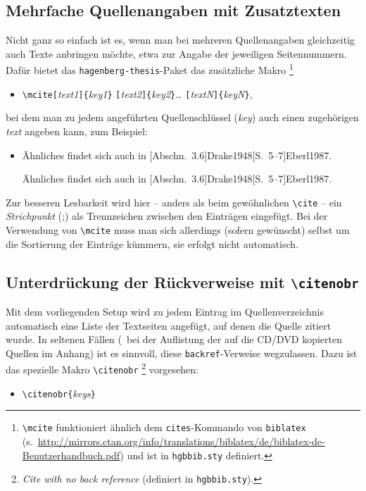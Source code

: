 \subsection{Mehrfache Quellenangaben mit Zusatztexten}

Nicht ganz so einfach ist es, wenn man bei mehreren Quellenangaben gleichzeitig
auch Texte anbringen möchte, etwa zur Angabe der jeweiligen Seitennummern.
Dafür bietet das \texttt{hagenberg-thesis}-Paket das zusätzliche Makro%
\footnote{\texttt{\textbackslash mcite} funktioniert ähnlich dem \texttt{{\bs}cites}-Kommando
von \texttt{biblatex} 
(s.\ \url{http://mirrors.ctan.org/info/translations/biblatex/de/biblatex-de-Benutzerhandbuch.pdf})
und ist in \texttt{hgbbib.sty} definiert.}
%
\begin{itemize}
\item[] 
\verb!\mcite[!\textit{text1}\verb!]{!\textit{key1}\verb!}!%
      \verb![!\textit{text2}\verb!]{!\textit{key2}\verb!}!\ldots%
			\verb![!\textit{textN}\verb!]{!\textit{keyN}\verb!}!,
\end{itemize}
bei dem man zu jedem angeführten Quellenschlüssel (\textit{key}) auch einen zugehörigen \textit{text}
angeben kann, zum Beispiel:
%
\begin{itemize}
\item
Ähnliches findet sich auch in 
[Abschn.~3.6]{Drake1948}[S.~5--7]{Eberl1987}.
%
\begin{LaTeXCode}[numbers=none]
Ähnliches findet sich auch in
[Abschn.~3.6]{Drake1948}[S.~5--7]{Eberl1987}.
\end{LaTeXCode}
\end{itemize}
%
Zur besseren Lesbarkeit wird hier -- anders als beim gewöhnlichen \texttt{\textbackslash cite} --
ein \emph{Strichpunkt} (;) als Trennzeichen zwischen den Einträgen eingefügt.
Bei der Verwendung von \texttt{\textbackslash mcite} muss man sich allerdings (sofern gewünscht) selbst 
um die Sortierung der Einträge kümmern, sie erfolgt nicht automatisch.



\subsection{Unterdrückung der Rückverweise mit \texttt{\textbackslash citenobr}}

Mit dem vorliegenden Setup wird zu jedem Eintrag im Quellenverzeichnis automatisch 
eine Liste der Textseiten angefügt, auf denen die Quelle zitiert wurde.
In seltenen Fällen (\zB\ bei der Auflistung der auf die CD/DVD kopierten Quellen im Anhang)
ist es sinnvoll, diese \texttt{backref}-Verweise wegzulassen. Dazu ist das spezielle Makro
\texttt{\textbackslash citenobr}%
\footnote{\emph{Cite with no back reference} (definiert in \texttt{hgbbib.sty}).}
vorgesehen:
%
\begin{itemize}
\item[] \verb!\citenobr{!\textit{keys}\verb!}! 
\end{itemize}



